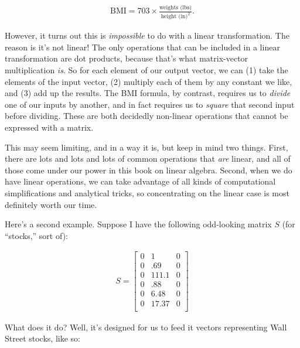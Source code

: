 \vspace{-.15in}
\begin{align*}
\textrm{BMI} = 703 \times \frac{\textrm{weights (lbs)}}{\textrm{height (in)}^2}.
\end{align*}
\vspace{-.15in}


However, it turns out this is \textit{impossible} to do with a linear
transformation. The reason is it's not linear! The only operations that can be
included in a linear transformation are dot products, because that's what
matrix-vector multiplication \textit{is}. So for each element of our output
vector, we can (1) take the elements of the input vector, (2) multiply each of
them by any constant we like, and (3) add up the results. The BMI formula, by
contrast, requires us to \textit{divide} one of our inputs by another, and in
fact requires us to \textit{square} that second input before dividing. These
are both decidedly non-linear operations that cannot be expressed with a
matrix.

This may seem limiting, and in a way it is, but keep in mind two things. First,
there are lots and lots and lots of common operations that \textit{are} linear,
and all of those come under our power in this book on linear algebra. Second,
when we do have linear operations, we can take advantage of all kinds of
computational simplifications and analytical tricks, so concentrating on the
linear case is most definitely worth our time.

\bigskip

Here's a second example. Suppose I have the following odd-looking matrix $S$
(for ``stocks,'' sort of):

\vspace{-.15in}
\begin{align*}
S =
\begin{bmatrix}
0 & 1 & 0 \\
0 & .69 & 0 \\
0 & 111.1 & 0 \\
0 & .88 & 0 \\
0 & 6.48 & 0 \\
0 & 17.37 & 0 \\
\end{bmatrix}
\end{align*}
\vspace{-.15in}

What does it do? Well, it's designed for us to feed it vectors representing
Wall Street stocks, like so:


